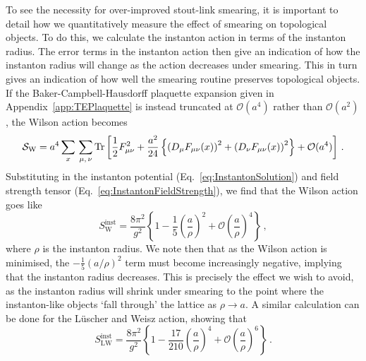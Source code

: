 To see the necessity for over-improved stout-link smearing, it is important to detail how we quantitatively measure the effect of smearing on topological objects. To do this, we calculate the instanton action in terms of the instanton radius. The error terms in the instanton action then give an indication of how the instanton radius will change as the action decreases under smearing. This in turn gives an indication of how well the smearing routine preserves topological objects. If the Baker-Campbell-Hausdorff plaquette expansion given in Appendix~\ref{app:TEPlaquette} is instead truncated at $\mathcal{O}(a^4)$ rather than $\mathcal{O}(a^2)$, the Wilson action becomes~\cite{GarciaPerez:1993lic}
%
\begin{equation}
\mathcal{S}_\text{W} = a^4\sum_x\,\sum_{\mu,\,\nu} \operatorname{Tr}\left[\frac{1}{2}F_{\mu\nu}^2 + \frac{a^2}{24}\left\lbrace \left( D _ { \mu } F _ { \mu \nu } ( x ) \right) ^ { 2 } + \left( D _ { \nu } F _ { \mu \nu } ( x ) \right) ^ { 2 } \right\rbrace + \mathcal{O}(a^4)\right]\, .
\end{equation}
%
Substituting in the instanton potential (Eq.~\eqref{eq:InstantonSolution}) and field strength tensor (Eq.~\eqref{eq:InstantonFieldStrength}), we find that the Wilson action goes like
%
\begin{equation}
S_\text{W}^\text{inst} = \frac{8\pi^2}{g^2}\left\{1-\frac{1}{5}\left(\frac{a}{\rho}\right)^2 + \mathcal{O}\left(\frac{a}{\rho}\right)^4 \right\}\, ,
\end{equation}
%
where $\rho$ is the instanton radius. We note then that as the Wilson action is minimised, the $-\frac{1}{5}\left(a/\rho\right)^2$ term must become increasingly negative, implying that the instanton radius decreases. This is precisely the effect we wish to avoid, as the instanton radius will shrink under smearing to the point where the instanton-like objects `fall through' the lattice as $\rho\rightarrow a$. A similar calculation can be done for the L\"uscher and Weisz action, showing that~\cite{GarciaPerez:1993lic}\\
%
\begin{equation}
S_\text{LW}^\text{inst} = \frac{8\pi^2}{g^2}\left\{ 1 - \frac { 17 } { 210 } \left(  \frac{a}{\rho} \right) ^ { 4 } + \mathcal { O } \left( \frac{a}{\rho} \right) ^ { 6 } \right\}\, .
\end{equation}
%

